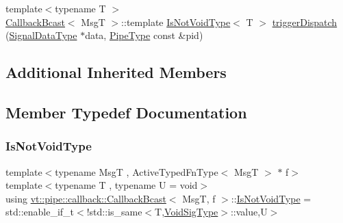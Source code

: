 \begin{DoxyCompactItemize}
\item 
{\footnotesize template$<$typename T $>$ }\\\hyperlink{structvt_1_1pipe_1_1callback_1_1_callback_bcast}{Callback\+Bcast}$<$ MsgT $>$\+::template \hyperlink{structvt_1_1pipe_1_1callback_1_1_callback_bcast_a3f5efa2edf7f4c47fe047e086e63a477}{Is\+Not\+Void\+Type}$<$ T $>$ \hyperlink{structvt_1_1pipe_1_1callback_1_1_callback_bcast_aad21dba24d76c98715a077f8e2b885ff}{trigger\+Dispatch} (\hyperlink{structvt_1_1pipe_1_1callback_1_1_callback_bcast_aaf994b71056001334d30d74fa9c958f9}{Signal\+Data\+Type} $\ast$data, \hyperlink{namespacevt_ac9852acda74d1896f48f406cd72c7bd3}{Pipe\+Type} const \&pid)
\end{DoxyCompactItemize}
\subsection*{Additional Inherited Members}


\subsection{Member Typedef Documentation}
\mbox{\label{structvt_1_1pipe_1_1callback_1_1_callback_bcast_a3f5efa2edf7f4c47fe047e086e63a477}} 
\subsubsection{\texorpdfstring{Is\+Not\+Void\+Type}{IsNotVoidType}}
{\footnotesize\ttfamily template$<$typename MsgT , Active\+Typed\+Fn\+Type$<$ Msg\+T $>$ $\ast$ f$>$ \\
template$<$typename T , typename U  = void$>$ \\
using \hyperlink{structvt_1_1pipe_1_1callback_1_1_callback_bcast}{vt\+::pipe\+::callback\+::\+Callback\+Bcast}$<$ MsgT, f $>$\+::\hyperlink{structvt_1_1pipe_1_1callback_1_1_callback_bcast_a3f5efa2edf7f4c47fe047e086e63a477}{Is\+Not\+Void\+Type} =  std\+::enable\+\_\+if\+\_\+t$<$!std\+::is\+\_\+same$<$T,\hyperlink{structvt_1_1pipe_1_1callback_1_1_callback_bcast_a64032b57b71c27653b93b3e13bf38145}{Void\+Sig\+Type}$>$\+::value,U$>$}

\mbox{\label{structvt_1_1pipe_1_1callback_1_1_callback_bcast_a3ca08c23824cfac76b837311a1d2c929}} 
